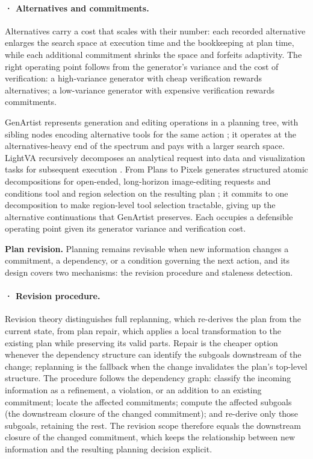 \paragraph{· Alternatives and commitments.} Alternatives carry a cost that scales with their number: each recorded alternative enlarges the search space at execution time and the bookkeeping at plan time, while each additional commitment shrinks the space and forfeits adaptivity. The right operating point follows from the generator's variance and the cost of verification: a high-variance generator with cheap verification rewards alternatives; a low-variance generator with expensive verification rewards commitments.

GenArtist represents generation and editing operations in a planning tree, with sibling nodes encoding alternative tools for the same action \cite{wang2024genartist}; it operates at the alternatives-heavy end of the spectrum and pays with a larger search space. LightVA recursively decomposes an analytical request into data and visualization tasks for subsequent execution \cite{zhao2024lightva}. From Plans to Pixels generates structured atomic decompositions for open-ended, long-horizon image-editing requests and conditions tool and region selection on the resulting plan \cite{avg260515181}; it commits to one decomposition to make region-level tool selection tractable, giving up the alternative continuations that GenArtist preserves. Each occupies a defensible operating point given its generator variance and verification cost.

\textbf{Plan revision.} Planning remains revisable when new information changes a commitment, a dependency, or a condition governing the next action, and its design covers two mechanisms: the revision procedure and staleness detection.

\paragraph{· Revision procedure.} Revision theory distinguishes full replanning, which re-derives the plan from the current state, from plan repair, which applies a local transformation to the existing plan while preserving its valid parts. Repair is the cheaper option whenever the dependency structure can identify the subgoals downstream of the change; replanning is the fallback when the change invalidates the plan's top-level structure. The procedure follows the dependency graph: classify the incoming information as a refinement, a violation, or an addition to an existing commitment; locate the affected commitments; compute the affected subgoals (the downstream closure of the changed commitment); and re-derive only those subgoals, retaining the rest. The revision scope therefore equals the downstream closure of the changed commitment, which keeps the relationship between new information and the resulting planning decision explicit.

